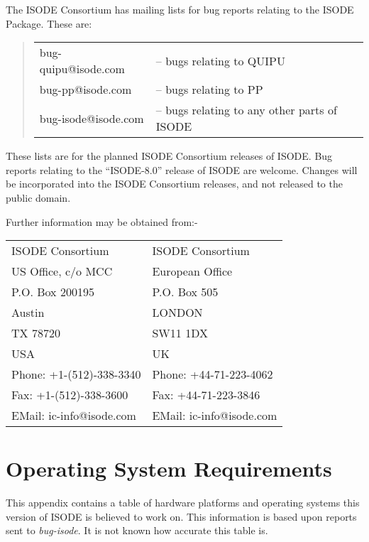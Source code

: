 The ISODE Consortium has mailing lists for bug reports relating to the
ISODE Package.   These are:

\begin{quote}\begin{tabular}{ll}
bug-quipu@isode.com &  -- bugs relating to QUIPU\\
bug-pp@isode.com    &  -- bugs relating to PP\\
bug-isode@isode.com &  -- bugs relating to any other parts of ISODE\\
\end{tabular}\end{quote}

These lists are for the planned ISODE Consortium releases of ISODE.  
Bug reports relating to the ``ISODE-8.0'' release of ISODE are
welcome.   Changes will be incorporated into the ISODE Consortium
releases, and not released to the public domain.  


Further information may be obtained from:-

\begin{tabular}{ll}
ISODE Consortium &               ISODE Consortium\\
US Office, c/o MCC &             European Office\\
P.O. Box 200195    &             P.O. Box 505\\
Austin             &             LONDON\\
TX 78720           &             SW11 1DX\\
USA                &           	 UK\\
Phone: +1-(512)-338-3340       & Phone: +44-71-223-4062\\
Fax:   +1-(512)-338-3600       & Fax:   +44-71-223-3846\\
EMail:  ic-info@isode.com      & EMail:  ic-info@isode.com\\
\end{tabular}

\chapter{Operating System Requirements}
\label{ports}

This appendix contains a table of hardware platforms and
operating systems this version of ISODE is believed to work on.  This
information is based upon reports sent to {\em bug-isode}.  
It is not known how accurate this table is.






